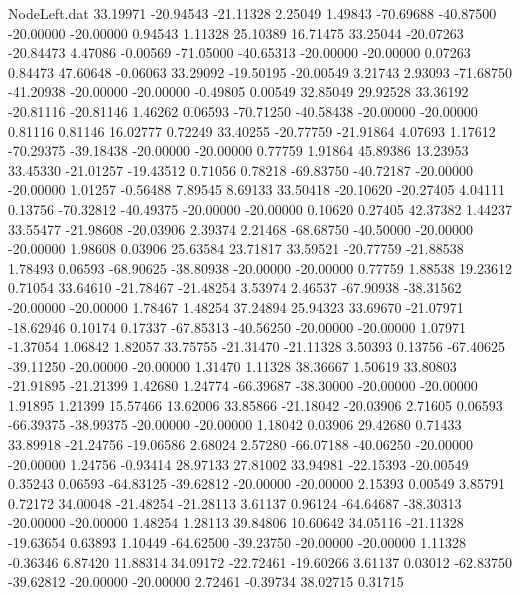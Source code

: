 \begin{filecontents}{NodeLeft.dat}
  33.19971  -20.94543  -21.11328     2.25049    1.49843  -70.69688  -40.87500  -20.00000  -20.00000    0.94543    1.11328   25.10389   16.71475
  33.25044  -20.07263  -20.84473     4.47086   -0.00569  -71.05000  -40.65313  -20.00000  -20.00000    0.07263    0.84473   47.60648   -0.06063
  33.29092  -19.50195  -20.00549     3.21743    2.93093  -71.68750  -41.20938  -20.00000  -20.00000   -0.49805    0.00549   32.85049   29.92528
  33.36192  -20.81116  -20.81146     1.46262    0.06593  -70.71250  -40.58438  -20.00000  -20.00000    0.81116    0.81146   16.02777    0.72249
  33.40255  -20.77759  -21.91864     4.07693    1.17612  -70.29375  -39.18438  -20.00000  -20.00000    0.77759    1.91864   45.89386   13.23953
  33.45330  -21.01257  -19.43512     0.71056    0.78218  -69.83750  -40.72187  -20.00000  -20.00000    1.01257   -0.56488    7.89545    8.69133
  33.50418  -20.10620  -20.27405     4.04111    0.13756  -70.32812  -40.49375  -20.00000  -20.00000    0.10620    0.27405   42.37382    1.44237
  33.55477  -21.98608  -20.03906     2.39374    2.21468  -68.68750  -40.50000  -20.00000  -20.00000    1.98608    0.03906   25.63584   23.71817
  33.59521  -20.77759  -21.88538     1.78493    0.06593  -68.90625  -38.80938  -20.00000  -20.00000    0.77759    1.88538   19.23612    0.71054
  33.64610  -21.78467  -21.48254     3.53974    2.46537  -67.90938  -38.31562  -20.00000  -20.00000    1.78467    1.48254   37.24894   25.94323
  33.69670  -21.07971  -18.62946     0.10174    0.17337  -67.85313  -40.56250  -20.00000  -20.00000    1.07971   -1.37054    1.06842    1.82057
  33.75755  -21.31470  -21.11328     3.50393    0.13756  -67.40625  -39.11250  -20.00000  -20.00000    1.31470    1.11328   38.36667    1.50619
  33.80803  -21.91895  -21.21399     1.42680    1.24774  -66.39687  -38.30000  -20.00000  -20.00000    1.91895    1.21399   15.57466   13.62006
  33.85866  -21.18042  -20.03906     2.71605    0.06593  -66.39375  -38.99375  -20.00000  -20.00000    1.18042    0.03906   29.42680    0.71433
  33.89918  -21.24756  -19.06586     2.68024    2.57280  -66.07188  -40.06250  -20.00000  -20.00000    1.24756   -0.93414   28.97133   27.81002
  33.94981  -22.15393  -20.00549     0.35243    0.06593  -64.83125  -39.62812  -20.00000  -20.00000    2.15393    0.00549    3.85791    0.72172
  34.00048  -21.48254  -21.28113     3.61137    0.96124  -64.64687  -38.30313  -20.00000  -20.00000    1.48254    1.28113   39.84806   10.60642
  34.05116  -21.11328  -19.63654     0.63893    1.10449  -64.62500  -39.23750  -20.00000  -20.00000    1.11328   -0.36346    6.87420   11.88314
  34.09172  -22.72461  -19.60266     3.61137    0.03012  -62.83750  -39.62812  -20.00000  -20.00000    2.72461   -0.39734   38.02715    0.31715

\end{filecontents}
